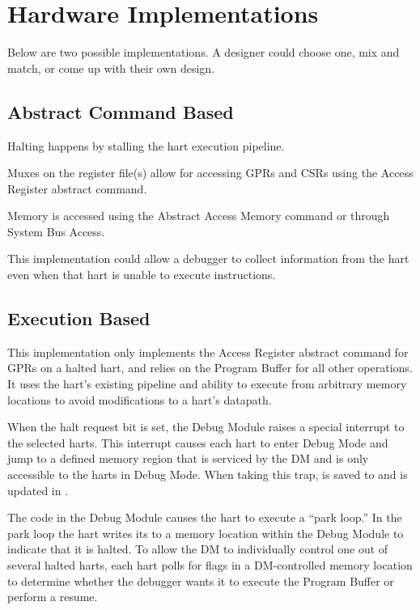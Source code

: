 \chapter{Hardware Implementations}
\label{sec:implementations}

Below are two possible implementations. A designer could choose one, mix and
match, or come up with their own design.

\section{Abstract Command Based}

Halting happens by stalling the hart execution pipeline.

Muxes on the register file(s) allow for accessing GPRs and CSRs
using the Access Register abstract command.

Memory is accessed using the Abstract Access Memory command or through System
Bus Access.

This implementation could allow a debugger to collect information from the hart
even when that hart is unable to execute instructions.

\section{Execution Based}

This implementation only implements the Access Register abstract command
for GPRs on a halted hart, and relies on the Program Buffer for all other
operations.
It uses the hart's existing pipeline
and ability to execute from arbitrary memory locations to avoid
modifications to a hart's datapath.

When the halt request bit is set, the Debug Module raises a special interrupt
to the selected harts. This interrupt causes each
hart to enter Debug Mode and jump to a defined
memory region that is serviced by the DM and is only accessible to the harts in Debug Mode.
When taking this trap, \Rpc is saved to \RcsrDpc and \FcsrDcsrCause is updated
in \RcsrDcsr.

The code in the Debug Module causes the hart to execute a ``park loop.''
In the park loop the hart writes its \Rmhartid to a
memory location within the Debug Module to indicate that it is halted.
To allow the DM to individually control one out of several
halted harts, each hart polls for flags in a DM-controlled memory location
to determine whether the debugger wants it to
execute the Program Buffer or perform a resume.

